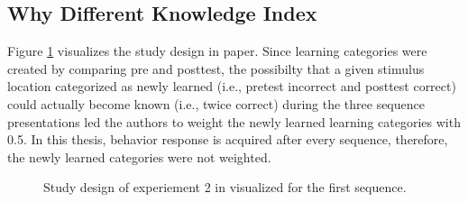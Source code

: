 \newpage
\subsection*{Why Different Knowledge Index} \label{chap:stein}
Figure \ref{fig:steine} visualizes the study design in \textcite{steinemannTrackingNeuralCorrelates2016} paper. Since learning categories were created by comparing pre and posttest, the possibilty that a given stimulus location categorized as newly learned (i.e., pretest incorrect and posttest correct) could actually become known (i.e., twice correct) during the three sequence presentations led the authors to weight the newly learned learning categories with 0.5. In this thesis, behavior response is acquired after every sequence, therefore, the newly learned categories were not weighted. 
\begin{figure}[H]
\centering
{}
\caption[]{Study design of experiement 2 in \textcite{steinemannTrackingNeuralCorrelates2016} visualized for the first sequence.} \label{fig:steine}
\end{figure}
\newpage
